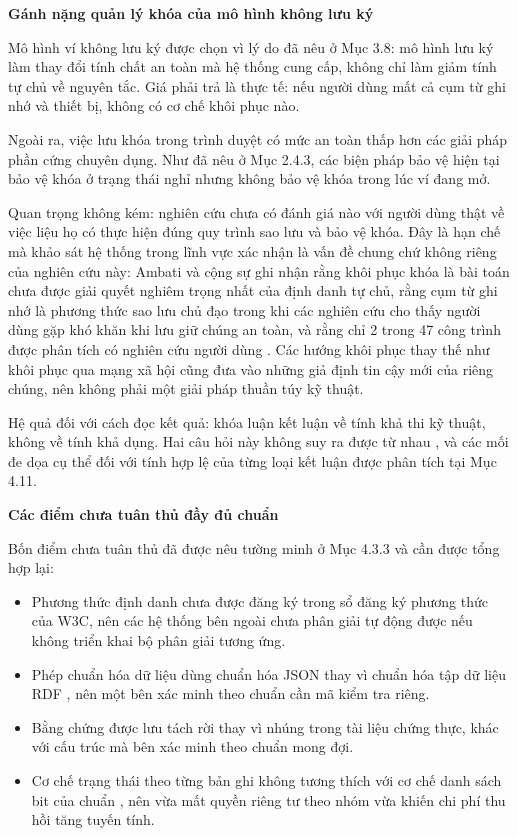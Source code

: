 \noindent \textbf{Gánh nặng quản lý khóa của mô hình không lưu ký}

Mô hình ví không lưu ký được chọn vì lý do đã nêu ở Mục 3.8: mô hình lưu ký làm thay đổi tính chất an toàn mà hệ thống cung cấp, không chỉ làm giảm tính tự chủ về nguyên tắc. Giá phải trả là thực tế: nếu người dùng mất cả cụm từ ghi nhớ và thiết bị, không có cơ chế khôi phục nào.

Ngoài ra, việc lưu khóa trong trình duyệt có mức an toàn thấp hơn các giải pháp phần cứng chuyên dụng. Như đã nêu ở Mục 2.4.3, các biện pháp bảo vệ hiện tại bảo vệ khóa ở trạng thái nghỉ nhưng không bảo vệ khóa trong lúc ví đang mở.

Quan trọng không kém: nghiên cứu chưa có đánh giá nào với người dùng thật về việc liệu họ có thực hiện đúng quy trình sao lưu và bảo vệ khóa. Đây là hạn chế mà khảo sát hệ thống trong lĩnh vực xác nhận là vấn đề chung chứ không riêng của nghiên cứu này: Ambati và cộng sự ghi nhận rằng khôi phục khóa là bài toán chưa được giải quyết nghiêm trọng nhất của định danh tự chủ, rằng cụm từ ghi nhớ là phương thức sao lưu chủ đạo trong khi các nghiên cứu cho thấy người dùng gặp khó khăn khi lưu giữ chúng an toàn, và rằng chỉ 2 trong 47 công trình được phân tích có nghiên cứu người dùng \cite{Ambati2026}. Các hướng khôi phục thay thế như khôi phục qua mạng xã hội cũng đưa vào những giả định tin cậy mới của riêng chúng, nên không phải một giải pháp thuần túy kỹ thuật.

Hệ quả đối với cách đọc kết quả: khóa luận kết luận về tính khả thi kỹ thuật, không về tính khả dụng. Hai câu hỏi này không suy ra được từ nhau \cite{SSI_Adoption2025}, và các mối đe dọa cụ thể đối với tính hợp lệ của từng loại kết luận được phân tích tại Mục 4.11.

\noindent \textbf{Các điểm chưa tuân thủ đầy đủ chuẩn}

Bốn điểm chưa tuân thủ đã được nêu tường minh ở Mục 4.3.3 và cần được tổng hợp lại:

\begin{itemize}
    \item Phương thức định danh  chưa được đăng ký trong sổ đăng ký phương thức của W3C, nên các hệ thống bên ngoài chưa phân giải tự động được nếu không triển khai bộ phân giải tương ứng.
    \item Phép chuẩn hóa dữ liệu dùng chuẩn hóa JSON thay vì chuẩn hóa tập dữ liệu RDF \cite{W3C_RDFC2024}, nên một bên xác minh theo chuẩn cần mã kiểm tra riêng.
    \item Bằng chứng được lưu tách rời thay vì nhúng trong tài liệu chứng thực, khác với cấu trúc mà bên xác minh theo chuẩn mong đợi.
    \item Cơ chế trạng thái theo từng bản ghi không tương thích với cơ chế danh sách bit của chuẩn \cite{W3C_BitstringStatusList2025}, nên vừa mất quyền riêng tư theo nhóm vừa khiến chi phí thu hồi tăng tuyến tính.
\end{itemize}

